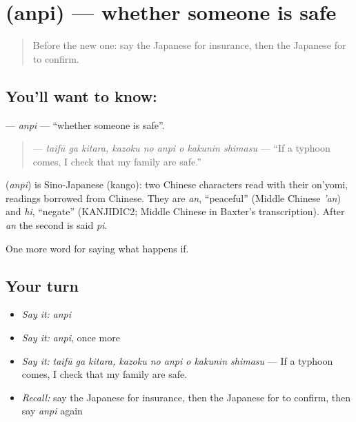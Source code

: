 \section[\texorpdfstring{\ja{あんぴ} (anpi)}{あんぴ (anpi)}]{ (anpi) — whether someone is safe}

\label{lesson:JA-C351-anpi}



\begin{quote}
Before the new one: say the Japanese for insurance, then the Japanese for to confirm.
\end{quote}

\subsection*{You'll want to know: }
\textbf{} — \emph{anpi} — \textquotedblleft{}whether someone is safe\textquotedblright{}.

\begin{quote}
\textbf{   } — \emph{taifū ga kitara, kazoku no anpi o kakunin shimasu} — \textquotedblleft{}If a typhoon comes, I check that my family are safe.\textquotedblright{}
\end{quote}

\begin{cousinweb}
\textbf{} (\emph{anpi}) is Sino-Japanese (kango): two Chinese characters read with their on'yomi, readings borrowed from Chinese. They are \emph{an}, \textquotedblleft{}peaceful\textquotedblright{} (Middle Chinese \emph{'an}) and \emph{hi}, \textquotedblleft{}negate\textquotedblright{} (KANJIDIC2; Middle Chinese in Baxter's transcription). After \emph{an} the second is said \emph{pi}.
\end{cousinweb}

\begin{grammarlens}[title={What you've built}]
One more word for saying what happens if.
\end{grammarlens}

\subsection*{Your turn}
\begin{itemize}
\raggedright
  \item \emph{Say it:} \emph{anpi}
  \item \emph{Say it:} \emph{anpi}, once more
  \item \emph{Say it:} \emph{taifū ga kitara, kazoku no anpi o kakunin shimasu} — If a typhoon comes, I check that my family are safe.
  \item \emph{Recall:} say the Japanese for insurance, then the Japanese for to confirm, then say \emph{anpi} again
\end{itemize}

